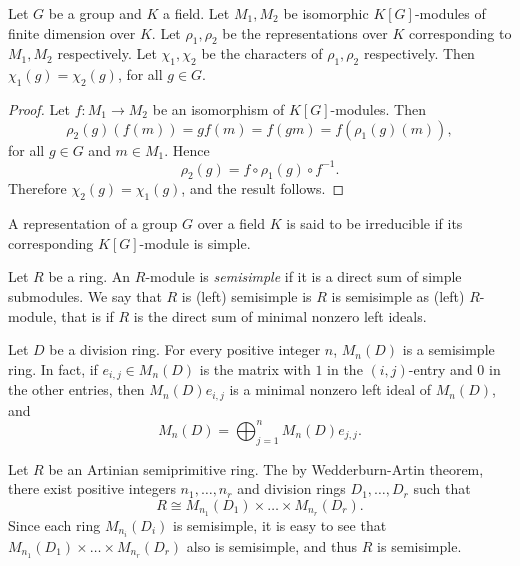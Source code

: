 \begin{lemma}\label{equivrep}
Let $G$ be a group and $K$ a field. Let $M_1,M_2$ be isomorphic $K[G]$-modules of finite dimension over $K$. Let $\rho_1,\rho_2$ be the representations over $K$ corresponding to $M_1,M_2$ respectively. Let $\chi_1,\chi_2$ be the characters of $\rho_1,\rho_2$ respectively. Then $\chi_1(g)=\chi_2(g)$, for all $g\in G$.
\end{lemma}

\begin{proof}
    Let $f: M_1\rightarrow M_2$ be an isomorphism of $K[G]$-modules. Then
    \[ \rho_2(g)(f(m))=gf(m)=f(gm)=f(\rho_1(g)(m)),\]
    for all $g\in G$ and $m\in M_1$. Hence
    \[ \rho_2(g)=f\circ \rho_1(g)\circ f^{-1}.\]
    Therefore $\chi_2(g)=\chi_1(g)$, and the result follows.
\end{proof}
 
\begin{definition}
A representation of a group $G$ over a field $K$ is said to be irreducible if its corresponding $K[G]$-module is simple.
\end{definition}

\begin{definition}
Let $R$ be a ring. An $R$-module is {\em semisimple} if it is a direct sum of simple submodules. We say that $R$ is (left) semisimple is $R$ is semisimple as (left) $R$-module, that is if $R$ is the direct sum of minimal nonzero left ideals. 
\end{definition}

\begin{example}
Let $D$ be a division ring. For every positive integer $n$, $M_n(D)$ is a semisimple ring. In fact, if $e_{i,j}\in M_n(D)$ is the matrix with $1$ in the $(i,j)$-entry and $0$ in the other entries, then $M_n(D)e_{i,j}$ is a minimal nonzero left ideal of $M_n(D)$, and
\[ M_n(D)=\bigoplus_{j=1}^nM_n(D)e_{j,j}.\]
\end{example}

\begin{example}\label{semisimple}
Let $R$ be an Artinian semiprimitive ring. The by Wedderburn-Artin theorem,
there exist positive integers $n_1,\dots ,n_r$ and division rings $D_1,\dots ,D_r$ such that
\[ R\cong M_{n_1}(D_1)\times\dots\times M_{n_r}(D_r).\]
Since each ring $M_{n_i}(D_i)$ is semisimple, it is easy to see that $M_{n_1}(D_1)\times\dots\times M_{n_r}(D_r)$ also is semisimple, 
and thus $R$ is semisimple.
\end{example}

